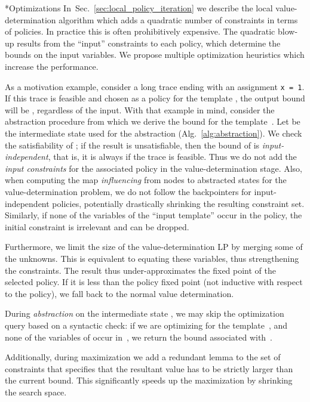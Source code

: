 \documentclass{llncs}
\makeatletter
\renewcommand{\paragraph}{\@startsection{paragraph}{4}{\z@}{0.8ex \@plus 0ex \@minus 1ex}{-1em}{\normalfont\normalsize\bfseries}}
\makeatother
\begin{document}
\paragraph*{Optimizations}
In~Sec.~\ref{sec:local_policy_iteration} we describe the local value-determination
algorithm which adds a quadratic number of constraints in terms of policies.
In practice this is often prohibitively expensive.
The quadratic blow-up results from the ``input'' constraints to each policy,
which determine the bounds on the input variables.
We propose multiple optimization heuristics which increase the performance.

As a motivation example, consider a long trace ending with an
assignment \texttt{x = 1}.
If this trace is feasible and chosen as a policy for the template , the
output bound will be , regardless of the input.
With that example in mind, consider the abstraction procedure from which we
derive the bound  for the template~.
Let  be the intermediate state used for the abstraction
(Alg.~\ref{alg:abstraction}).
We check the satisfiability of ;
if the result is unsatisfiable, then the bound of  is
\emph{input-independent}, that is, it is always  if the
trace is feasible.
Thus we do not add the \emph{input constraints} for
the associated policy in the value-determination stage.
Also, when computing the map \emph{influencing} from nodes to abstracted states for the
value-determination problem, we do not follow the backpointers for
input-independent policies, potentially drastically shrinking
the resulting constraint set.
Similarly, if none of the variables of the ``input template'' occur in the
policy, the initial constraint is irrelevant and can be dropped.

Furthermore,
we limit the size of the value-determination LP by merging some of the unknowns.
This is equivalent to equating these variables, thus strengthening the constraints.
The result thus under-approximates the fixed point of the selected policy.
If it is less than the policy fixed point (not inductive with respect to the policy),
we fall back to the normal value determination.

During \emph{abstraction} on the intermediate state ,
we may skip the optimization query based on a syntactic check:
if we are optimizing for the template~, and
none of the variables of  occur in~, we return the bound
associated with~.

Additionally, during maximization we add a redundant lemma to the set of constraints that
specifies that the resultant value has to be strictly larger than the current
bound.
This significantly speeds up the maximization by shrinking the search space.
\end{document}
